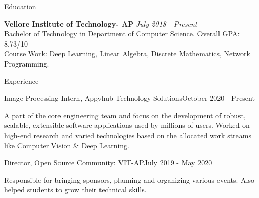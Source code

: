 \documentclass{resume} %
\begin{document}

\begin{rSection}{Education}

{\bf Vellore Institute of Technology- AP} \hfill {\em July 2018 - Present} 
\\ Bachelor of Technology in Department of Computer Science.\hfill { Overall GPA: 8.73/10}
\\ Course Work: Deep Learning, Linear Algebra, Discrete Mathematics, Network Programming.


\end{rSection}



\begin{rSection}{Experience}

\begin{rSubsection}{Image Processing Intern, Appyhub Technology Solutions}{October 2020 - Present}{}{}
\item A part of the core engineering team and focus on the development of robust, scalable, extensible software applications used by millions of users. Worked on high-end research and varied technologies based on the allocated work streams like Computer Vision \& Deep Learning.

\end{rSubsection}



\begin{rSubsection}{Director, Open Source Community: VIT-AP}{July 2019 - May 2020}{}{}
\item Responsible for bringing sponsors, planning and organizing various events. Also helped students to grow their technical skills.

\end{rSubsection}

\end{rSection}
\end{document}
